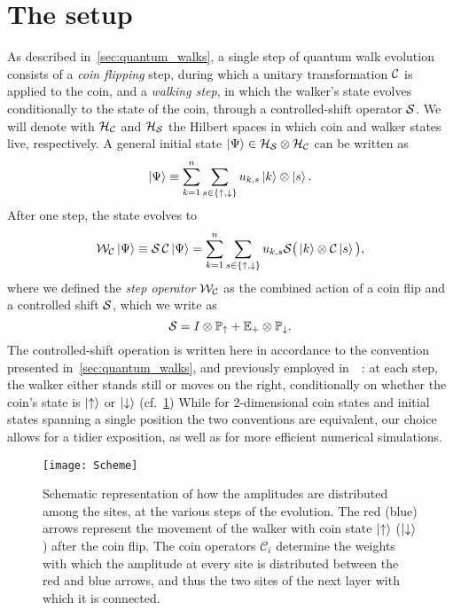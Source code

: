 \section{The setup}
\label{sec:qw_setup}
As described in~\cref{sec:quantum_walks}, a single step of quantum walk evolution consists of a \emph{coin flipping} step, during which a unitary transformation ${\mathcal{C}}$ is applied to the coin, and a \emph{walking step}, in which the walker's state evolves conditionally to the state of the coin, through a controlled-shift operator ${\mathcal{S}}$.
We will denote with ${{\mathcal{H}}_{\mathcal{C}}}$ and ${{\mathcal{H}}_{\mathcal{S}}}$ the Hilbert spaces in which coin and walker states live, respectively.
A general initial state $\ket\Psi\in{{\mathcal{H}}_{\mathcal{S}}}\otimes{{\mathcal{H}}_{\mathcal{C}}}$ can be written as
\begin{equation}
	\ket\Psi \equiv \sum_{k=1}^n \sum_{s\in\{\uparrow,\downarrow\}}
	u_{k,s} \ket{k} \otimes \ket{s}.
	\label{eq:initial_state}
\end{equation}
After one step, the state evolves to
\begin{equation}
	\mathcal W_{\mathcal C} \ket\Psi \equiv
	\mathcal S \,\mathcal C \ket\Psi
	= \sum_{k=1}^n \sum_{s\in\{\uparrow,\downarrow\}}
	u_{k,s}
	\mathcal S \big( \ket{k} \otimes \mathcal C \ket{s} \big),
	\label{eq:step_operator_definition}
\end{equation}
where we defined the \emph{step operator} ${\mathcal{W}}_{{\mathcal{C}}}$ as the combined action of a coin flip and a controlled shift ${\mathcal{S}}$, which we write as
\begin{equation}
	{\mathcal{S}} =
    I\otimes \mathbb{P}_\uparrow + \mathbb{E}_+\otimes\mathbb{P}_\downarrow.
	\label{eq:controlled_shift_operator}
\end{equation}
The controlled-shift operation is written here in accordance to the convention presented in~\cref{sec:quantum_walks}, and previously employed in~~\cite{hoyer2009faster, montero2013unidirectional,montero2015quantum}: at each step, the walker either stands still or moves on the right, conditionally on whether the coin's state is $\ket{\uparrow}$ or $\ket{\downarrow}$ (cf.~\cref{fig:qw_conceptual_scheme_walker})
While for 2-dimensional coin states and initial states spanning a single position the two conventions are equivalent, our choice allows for a tidier exposition, as well as for more efficient numerical simulations.

\begin{figure}[tb]
\center
\texttt{[image: Scheme]}
\caption{
    Schematic representation of how the amplitudes are distributed among the sites, at the various steps of the evolution.
    The red (blue) arrows represent the movement of the walker with coin state $\ket\uparrow$ ($\ket\downarrow$) after the coin flip.
    The coin operators $\mathcal C_i$ determine the weights with which the amplitude at every site is distributed between the red and blue arrows, and thus the two sites of the next layer with which it is connected.
}
\label{fig:qw_conceptual_scheme_walker}
\end{figure}

